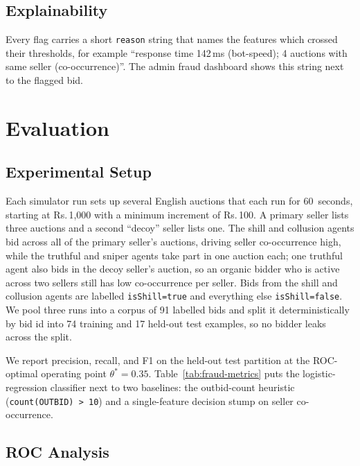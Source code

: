 \documentclass[conference]{IEEEtran}
\begin{document}
\subsection{Explainability}

Every flag carries a short {\tt reason} string that names the features
which crossed their thresholds, for example ``response time 142\,ms
(bot-speed); 4 auctions with same seller (co-occurrence)''. The admin
fraud dashboard shows this string next to the flagged bid.

\section{Evaluation}

\subsection{Experimental Setup}
\label{sec:sim}

Each simulator run sets up several English auctions that each run for
60~seconds, starting at Rs.\,1{,}000 with a minimum increment of
Rs.\,100. A primary seller lists three auctions and a second ``decoy''
seller lists one. The shill and collusion agents bid across all of the
primary seller's auctions, driving seller co-occurrence high, while the
truthful and sniper agents take part in one auction each; one truthful
agent also bids in the decoy seller's auction, so an organic bidder who
is active across two sellers still has low co-occurrence per seller. Bids
from the shill and collusion agents are labelled {\tt isShill=true} and
everything else {\tt isShill=false}. We pool three runs into a corpus of
91 labelled bids and split it deterministically by bid id into 74
training and 17 held-out test examples, so no bidder leaks across the
split.

We report precision, recall, and F1 on the held-out test partition at
the ROC-optimal operating point $\theta^{*} = 0.35$.
Table~\ref{tab:fraud-metrics} puts the logistic-regression classifier
next to two baselines: the outbid-count heuristic
({\tt count(OUTBID) > 10}) and a single-feature decision stump on seller
co-occurrence.



\subsection{ROC Analysis}
\end{document}
